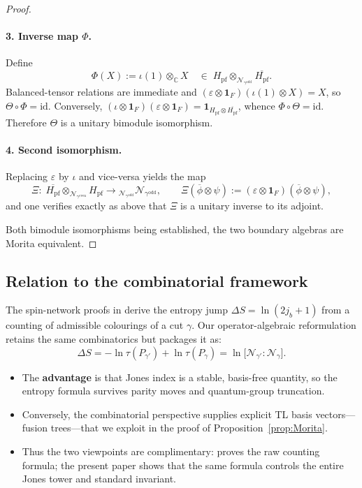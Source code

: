 \documentclass[11pt]{article}
\begin{document}
\begin{proof}
\paragraph{3. Inverse map $\Phi$.}
Define
\[
  \Phi(X):=\iota(1)\otimes_{\mathbb C} X
  \quad\in\;
  H_{\mathrm{pf}}\!\otimes_{\mathcal N_{\gamma^{\mathrm{odd}}}}
  \overline{H_{\mathrm{pf}}}.
\]
Balanced-tensor relations are immediate and
$(\varepsilon\!\otimes\!\mathbf1_F)(\iota(1)\otimes X)=X$,
so $\Theta\!\circ\!\Phi=\mathrm{id}$.
Conversely,
$(\iota\!\otimes\!\mathbf1_F)(\varepsilon\!\otimes\!\mathbf1_F)
  =\mathbf1_{H_{\mathrm{pf}}\otimes\overline{H_{\mathrm{pf}}}}$,
whence $\Phi\!\circ\!\Theta=\mathrm{id}$.
Therefore $\Theta$ is a unitary bimodule isomorphism.

\paragraph{4. Second isomorphism.}
Replacing $\varepsilon$ by $\iota$ and vice-versa yields the map
\[
  \Xi:\;
  \overline{H_{\mathrm{pf}}}\!\otimes_{\mathcal N_{\gamma^{\mathrm{even}}}}
  H_{\mathrm{pf}}
  \longrightarrow
  {}_{\mathcal N_{\gamma^{\mathrm{odd}}}}\mathcal N_{\gamma^{\mathrm{odd}}},
  \qquad
  \Xi(\overline\phi\otimes\psi)
  :=(\varepsilon\!\otimes\!\mathbf1_F)(\overline\phi\otimes\psi),
\]
and one verifies exactly as above that $\Xi$ is a unitary inverse to its
adjoint.

\medskip
Both bimodule isomorphisms being established, the two boundary algebras
are Morita equivalent.
\end{proof}

\subsection*{Relation to the combinatorial framework \cite{BridgeMono,EntropyMono}}
The spin-network proofs in \cite{BridgeMono,EntropyMono} derive the entropy
jump
$\Delta S=\ln(2j_b+1)$
from a counting of admissible colourings of a cut $\gamma$.
Our operator-algebraic reformulation retains the same combinatorics but
packages it as:
\[
  \Delta S
  =-\ln\tau(P_{\gamma'})
  +\ln\tau(P_{\gamma})
  =\ln\bigl[\mathcal N_{\gamma'}:\mathcal N_{\gamma}\bigr].
\]
\begin{itemize}
\item The {\bf advantage} is that Jones index is a stable, basis-free
      quantity, so the entropy formula survives parity moves and quantum-group
      truncation.
\item Conversely, the combinatorial perspective supplies explicit
      TL basis vectors—fusion trees—that we exploit in the proof of
      Proposition~\ref{prop:Morita}.
\item Thus the two viewpoints are complimentary: \cite{BridgeMono,EntropyMono}
      proves the raw counting formula; the present paper shows that the
      same formula controls the entire Jones tower and standard invariant.
\end{itemize}
\end{document}
